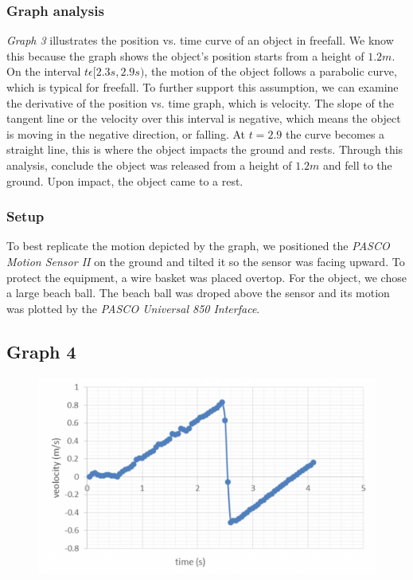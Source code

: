 \documentclass[11pt, letterpaper, includehead]{article}
\begin{document}
  \subsubsection{Graph analysis}
  \emph{Graph 3} illustrates the position vs. time curve of an object in freefall. 
  We know this because the graph shows the object's position starts from a height of 
  $1.2m$. On the interval $t\epsilon[2.3s, 2.9s)$, the motion of the object follows a 
  parabolic curve, which is typical for freefall. To further support this assumption,
  we can examine the derivative of the position vs. time graph, which is velocity. 
  The slope of the tangent line or the velocity over this interval is negative, 
  which means the object is moving in the negative direction, or falling. At $t = 2.9$ 
  the curve becomes a straight line, this is where the object impacts the ground and rests. 
  Through this analysis, conclude the object was released from a height of $1.2m$ and 
  fell to the ground. Upon impact, the object came to a rest.\\
  
  \subsubsection{Setup}
  To best replicate the motion depicted by the graph, we positioned the \emph{PASCO Motion Sensor II} 
  on the ground and tilted it so the sensor was facing upward. To protect the equipment, 
  a wire basket was placed overtop. For the object, we chose a large beach ball. 
  The beach ball was droped above the sensor and its motion was plotted by the 
  \emph{PASCO Universal 850 Interface}.

  \subsection{Graph 4}

  \begin{figure}[H] %
    \centering 
    \includegraphics[width=\linewidth]{graph_4.png}
  \end{figure}
\end{document}
